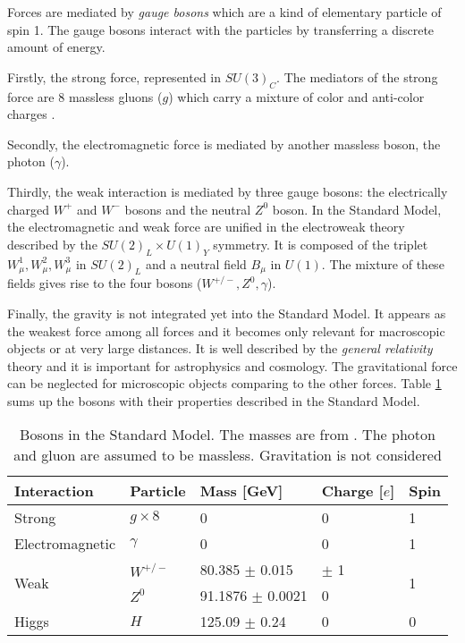 Forces are mediated by \textit{gauge bosons} which are a kind of elementary particle of spin 1. The gauge bosons interact with the particles by transferring a discrete amount of energy.

Firstly, the strong force, represented in $SU(3)_{C}$. The mediators of the strong force are 8 massless gluons ($g$) which carry a mixture of color and anti-color charges \cite{Griffiths:343277}.

Secondly, the electromagnetic force is mediated by another massless boson, the photon ($\gamma$).

Thirdly, the weak interaction is mediated by three gauge bosons: the electrically charged $W^+$ and $W^-$ bosons and the neutral $Z^0$ boson. In the Standard Model, the electromagnetic and weak force are unified in the electroweak theory described by the $SU(2)_{L} \times U(1)_{Y}$ symmetry. It is composed of the triplet $W_{\mu}^1, W_{\mu}^2, W_{\mu}^3$ in $SU(2)_{L}$ and a neutral field $B_{\mu}$ in $U(1)$. The mixture of these fields gives rise to the four bosons ($W^{+/-}, Z^0, \gamma$).

Finally, the gravity is not integrated yet into the Standard Model. It appears as the weakest force among all forces and it becomes only relevant for macroscopic objects or at very large distances. It is well described by the \textit{general relativity} theory \cite{Einstein:1905ve} and it is important for astrophysics and cosmology. The gravitational force can be neglected for microscopic objects comparing to the other forces. Table \ref{table:Bosons} sums up the bosons with their properties described in the Standard Model.

\begin{table}[htb!]
  \centering
  \caption{Bosons in the Standard Model. The masses are from \cite{Patrignani:2016xqp}. The photon and gluon are assumed to be massless. Gravitation is not considered}
  \label{table:Bosons}
  \begin{tabular}{@{}lllll@{}} \toprule
    Interaction & Particle & Mass [GeV] & Charge [$e$] & Spin\\
    \midrule
    Strong & $g \times 8$ & 0 & 0 & 1\\
    Electromagnetic & $\gamma$ & 0 & 0 & 1\\
    \multirow{2}{*}{Weak} & $W^{+/-}$ & 80.385 $\pm$ 0.015 & $\pm$ 1 & \multirow{2}{*}{1}\\
    & $Z^0$ & 91.1876 $\pm$ 0.0021 & 0 &\\
    Higgs & $H$ & 125.09 $\pm$ 0.24 & 0 & 0\\
    \bottomrule
  \end{tabular}
\end{table}

